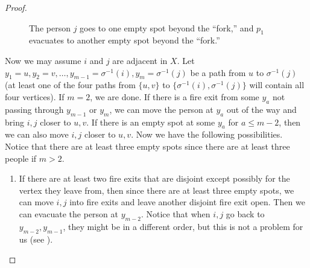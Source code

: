 \documentclass{mystyle}
\begin{document}
\begin{proof}
\begin{figure}[ht]
            \caption{The person $j$ goes to one empty spot beyond the ``fork,'' and $p_1$ evacuates to another empty spot beyond the ``fork.''}
            \label{fig_8}
        \end{figure}

    Now we may assume $i$ and $j$ are adjacent in $X$. Let $y_1 = u, y_2 = v, \ldots, y_{m - 1} = \sigma^{-1}(i), y_{m} = \sigma^{-1}(j)$ be a path from $u$ to $\sigma^{-1}(j)$ (at least one of the four paths from $\{u, v\}$ to $\{\sigma^{-1}(i), \sigma^{-1}(j)\}$ will contain all four vertices). If $m = 2$, we are done. If there is a fire exit from some $y_a$ not passing through $y_{m - 1}$ or $y_{m}$, we can move the person at $y_a$ out of the way and bring $i, j$ closer to $u, v$. If there is an empty spot at some $y_a$ for $a \leq m-2$, then we can also move $i, j$ closer to $u, v$. Now we have the following possibilities. Notice that there are at least three empty spots since there are at least three people if $m > 2$.
    \begin{enumerate}
        \item If there are at least two fire exits that are disjoint except possibly for the vertex they leave from, then since there are at least three empty spots, we can move $i, j$ into fire exits and leave another disjoint fire exit open. Then we can evacuate the person at $y_{m - 2}$. Notice that when $i, j$ go back to $y_{m - 2}, y_{m - 1}$, they might be in a different order, but this is not a problem for us (see ).
        \begin{figure}[ht]
            \centering
\end{figure}
\end{enumerate}
\end{proof}
\end{document}
